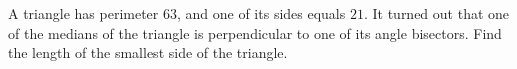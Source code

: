 A triangle has perimeter $63$, and one of its sides equals $21$. It turned out that one of the medians of the triangle is perpendicular to one of its angle bisectors. Find the length of the smallest side of the triangle.
